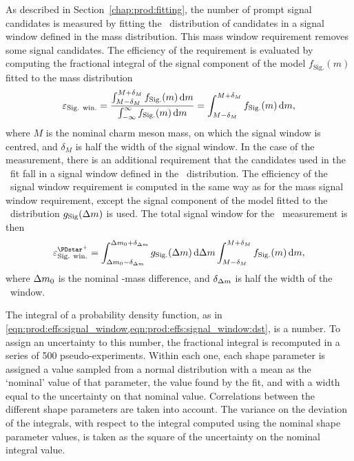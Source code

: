 As described in Section~\ref{chap:prod:fitting}, the number of prompt signal 
candidates is measured by fitting the \lnipchisq\ distribution of candidates in 
a signal window defined in the mass distribution.
This mass window requirement removes some signal candidates.
The efficiency of the requirement is evaluated by computing the fractional 
integral of the signal component of the model $f_{\text{Sig.}}(m)$ fitted to 
the mass distribution
\begin{equation}
  \effsigwin = \frac{%
    \int_{M - \delta_{M}}^{M +\delta_{M}} f_{\text{Sig.}}(m) \dif{m}
  }{%
    \int_{-\infty}^{\infty} f_{\text{Sig.}}(m) \dif{m}
  }
  = \int_{M - \delta_{M}}^{M +\delta_{M}} f_{\text{Sig.}}(m) \dif{m},
    \label{eqn:prod:effs:signal_window}
\end{equation}
where $M$ is the nominal charm meson mass, on which the signal window is 
centred, and $\delta_{M}$ is half the width of the signal window.
In the case of the \PDstarp measurement, there is an additional requirement 
that the candidates used in the \lnipchisq\ fit fall in a signal window defined 
in the \deltam\ distribution.
The efficiency of the \deltam\ signal window requirement is computed in the 
same way as for the mass signal window requirement, except the signal component 
of the model fitted to the \deltam\ distribution $g_{\text{Sig}}(\Delta{m})$ is 
used.
The total signal window for the \PDstarp\ measurement is then
\begin{equation}
  \effsigwin^{\PDstarp} =
    \int_{\deltam_{0} - \delta_{\deltam}}^{\deltam_{0} +\delta_{\deltam}} g_{\text{Sig.}}(\deltam) \dif{\deltam}
    \int_{M - \delta_{M}}^{M +\delta_{M}} f_{\text{Sig.}}(m) \dif{m},
    \label{eqn:prod:effs:signal_window:dst}
\end{equation}
where $\Delta{m}_{0}$ is the nominal \PDstarp-\PDzero mass difference, and $\delta_{\Delta{m}}$ is half the width of the \deltam\ window.

The integral of a probability density function, as in \cref{eqn:prod:effs:signal_window,eqn:prod:effs:signal_window:dst}, is a number.
To assign an uncertainty to this number, the fractional integral is recomputed 
in a series of 500 pseudo-experiments.
Within each one, each shape parameter is assigned a value sampled from a 
normal distribution with a mean as the `nominal' value of that parameter, the 
value found by the fit, and with a width equal to the uncertainty on that nominal 
value. Correlations between the different shape parameters are taken into account.
The variance on the deviation of the integrals, with respect to the integral 
computed using the nominal shape parameter values, is taken as the square of 
the uncertainty on the nominal integral value.

